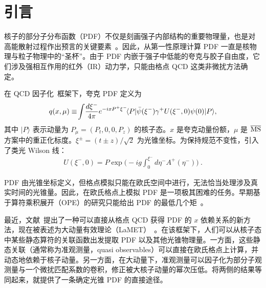 \section{引言}\label{sec:intro}

核子的部分子分布函数（PDF）不仅是刻画强子内部结构的重要物理量，也是对高能散射过程作出预言的关键要素~\cite{Butterworth:2015oua,Alekhin:2017kpj,Gao:2017yyd}。因此，从第一性原理计算 PDF 一直是核物理与粒子物理中的“圣杯”。由于 PDF 内嵌于强子中低能的夸克与胶子自由度，它们涉及强相互作用的红外（IR）动力学，只能由格点 QCD 这类非微扰方法确定。

在 QCD 因子化~\cite{Collins:2011zzd}框架下，夸克 PDF 定义为
\begin{align} \label{eq:lcpdf}
q(x,\mu) \equiv\! \int\! {d\xi^-\over 4\pi} e^{-ixP^+\xi^-}\! \langle P | \bar{\psi}  (\xi^-) \gamma^+ U (\xi^-, 0) \psi (0) | P \rangle ,
\end{align}
其中 $|P\rangle$ 表示动量为 $P_\mu=(P_t,0,0,P_z)$ 的核子态。$x$ 是夸克动量份额，$\mu$ 是 $\overline{\rm MS}$ 方案中的重正化标度。$\xi^{\pm}=(t\pm z)/\sqrt{2}$ 为光锥坐标。为保持规范不变性，引入了类光 Wilson 线：
\begin{align}
U(\xi^-,0) = P\exp\biggl(-ig\int_0^{\xi^-} d\eta^- A^+(\eta^-)\biggr)\ .
\end{align}

PDF 由光锥坐标定义，但格点模拟只能在欧氏空间中进行，无法恰当处理涉及真实时间的光锥量。因此，在欧氏格点上模拟 PDF 是一项极其困难的任务。早期基于算符乘积展开（OPE）的研究只能给出 PDF 的最低几个矩~\cite{Martinelli:1987zd,Martinelli:1988xs,Detmold:2001dv,Dolgov:2002zm}。

最近，文献~\cite{Ji:2013dva}提出了一种可以直接从格点 QCD 获得 PDF 的 $x$ 依赖关系的新方法，现在被表述为大动量有效理论（LaMET）~\cite{Ji:2014gla}。在该框架下，人们可以从核子态中某些静态算符的关联函数出发提取 PDF 以及其他光锥物理量。一方面，这些静态关联（通常称为准观测量，quasi observables）可以直接在欧氏格点上计算，并动态地依赖于核子动量。另一方面，在大动量下，准观测量可以因子化为部分子观测量与一个微扰匹配系数的卷积，修正被大核子动量的幂次压低。将两侧的结果等同起来，就提供了一条确定光锥 PDF 的直接途径。

